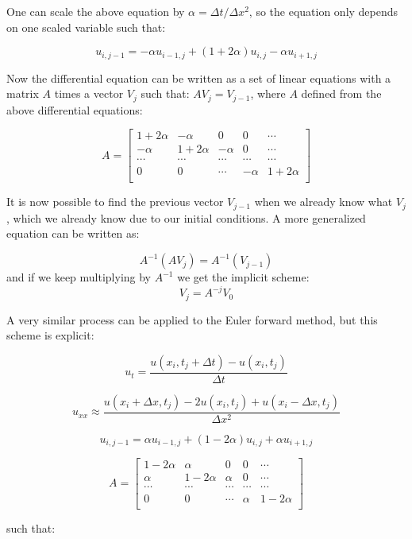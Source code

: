 \documentclass[10pt,a4paper]{article}
\begin{document}
\noindent One can scale the above equation by $\alpha = \Delta t / \Delta x^2$, so the equation only depends on one scaled variable such that:

$$
u_{i,j-1} = -\alpha u_{i-1,j} + (1 + 2\alpha)u_{i,j} - \alpha u_{i+1,j}
$$

\noindent Now the differential equation can be written as a set of linear equations with a matrix $A$ times a vector $V_j$ such that: $AV_j = V_{j-1}$, where $A$ defined from the above differential equations:

$$
A = \begin{bmatrix}
1 + 2\alpha & -\alpha & 0 & 0 &\cdots\\
-\alpha & 1 + 2\alpha & -\alpha & 0 & \cdots\\
\cdots & \cdots & \cdots & \cdots & \cdots\\
0 & 0 & \cdots & -\alpha & 1 + 2\alpha\\

\end{bmatrix}
$$

\noindent It is now possible to find the previous vector $V_{j-1}$ when we already know what $V_j$, which we already know due to our initial conditions. A more generalized equation can be written as:

$$
A^{-1}(AV_j) = A^{-1}(V_{j-1})
$$
\noindent and if we keep multiplying by $A^{-1}$ we get the implicit scheme:
$$
V_j = A^{-j}V_0
$$

\noindent A very similar process can be applied to the Euler forward method, but this scheme is explicit:

$$
u_t = \frac{u(x_i,t_j + \Delta t) - u(x_i,t_j)}{\Delta t}
$$

$$
u_{xx} \approx \frac{u(x_i + \Delta x,t_j) - 2u(x_i,t_j) + u(x_i - \Delta x,t_j)}{\Delta x^2} 
$$

$$
u_{i,j-1} = \alpha u_{i-1,j} + (1 - 2\alpha)u_{i,j} + \alpha u_{i+1,j}
$$

$$
A = \begin{bmatrix}
1 - 2\alpha & \alpha & 0 & 0 &\cdots\\
\alpha & 1 - 2\alpha & \alpha & 0 & \cdots\\
\cdots & \cdots & \cdots & \cdots & \cdots\\
0 & 0 & \cdots & \alpha & 1 - 2\alpha\\

\end{bmatrix}
$$

\noindent such that:
\end{document}
